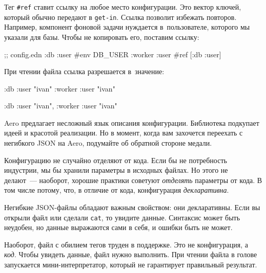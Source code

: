 Тег \verb|#ref| ставит ссылку на любое место конфигурации. Это вектор ключей,
который обычно передают в \verb|get-in|. Ссылка позволит избежать повторов.
Например, компонент фоновой задачи нуждается в~пользователе, которого мы указали
для базы. Чтобы не копировать его, поставим ссылку:

\begin{english}
  \begin{clojure}
;; config.edn
{:db {:user #env DB_USER}
 :worker {:user #ref [:db :user]}}
  \end{clojure}
\end{english}

\noindent
При чтении файла ссылка разрешается в~значение:

\ifx\devicetype\mobile

\begin{english}
  \begin{clojure}
{:db {:user "ivan"}
 :worker {:user "ivan"}}
  \end{clojure}
\end{english}

\else

\begin{english}
  \begin{clojure}
{:db {:user "ivan"}, :worker {:user "ivan"}}
  \end{clojure}
\end{english}

\fi

Aero предлагает несложный язык описания конфигурации. Библиотека подкупает идеей
и красотой реализации. Но в момент, когда вам захочется переехать с негибкого
JSON на Aero, подумайте об обратной стороне медали.


Конфигурацию не случайно отделяют от кода. Если бы не потребность индустрии, мы
бы хранили параметры в исходных файлах. Но этого не делают~--- наоборот, хорошие
практики советуют \emph{отделять} параметры от кода. В том числе потому, что, в
отличие от кода, конфигурация \emph{декларативна}.

Негибкие JSON-файлы обладают важным свойством: они декларативны. Если вы открыли
файл или сделали \verb|cat|, то увидите данные. Синтаксис может быть неудобен,
но данные выражаются сами в себя, и ошибки быть не может.

Наоборот, файл с обилием тегов труден в поддержке. Это не конфигурация,
а \emph{код}. Чтобы увидеть данные, файл нужно выполнить. При чтении
файла в голове запускается мини-интерпретатор, который не гарантирует
правильный результат.

